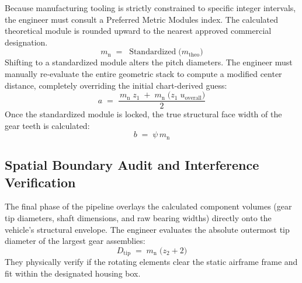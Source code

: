 		Because manufacturing tooling is strictly constrained to specific integer intervals, the engineer must consult a 
		Preferred Metric Modules index. The calculated theoretical module is rounded upward to the nearest approved commercial designation.  
			\begin{equation}
				\label{eq:normalmodule}
				m_{\text{n}}
				\;=\;
				\operatorname{Standardized}\!\bigl(m_{\text{theo}}\bigr)
			\end{equation}
		Shifting to a standardized module alters the pitch diameters. The engineer must manually re-evaluate the entire 
		geometric stack to compute a modified center distance, completely overriding the initial chart-derived guess: 
			\begin{equation}
				\label{eq:angle}
				a \;=\;
				\frac{\,m_{\text{n}}\;z_{\text{1}}
				\;+\;m_{\text{n}}\;
				\bigl( z_{\text{1}}\;u_{\text{overall}} \bigr)}{2}
			\end{equation}
		Once the standardized module is locked, the true structural face width of the gear teeth is calculated: 
			\begin{equation}
				\label{eq:truestructuralfacewidth}
				b \;=\; \psi\,m_{\text{n}}
			\end{equation}

	\subsection{Spatial Boundary Audit and Interference Verification}
		The final phase of the pipeline overlays the calculated component 
		volumes (gear tip diameters, shaft dimensions, and raw bearing widths) directly onto the vehicle's structural 
		envelope. The engineer evaluates the absolute outermost tip diameter of the largest gear assemblies: 
			\begin{equation}
				\label{eq:absoluteoutermosttipdiameter}
				D_{\text{tip}}
				\;=\;
				m_{\text{n}}\;\bigl(z_{\text{2}} + 2\bigr)
			\end{equation}
		They physically verify if the rotating elements clear the static airframe frame and fit within 
		the designated housing box. 

